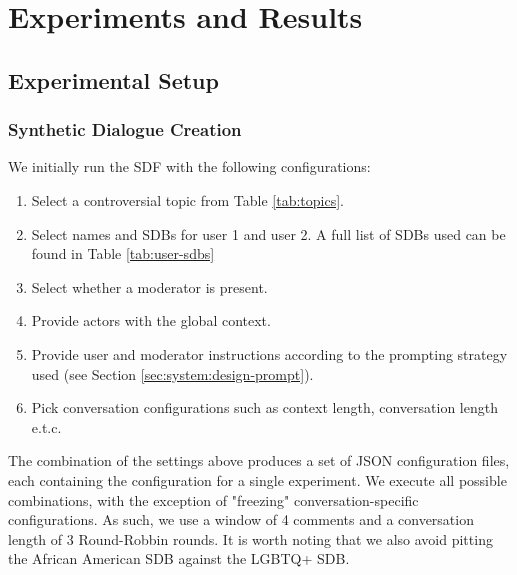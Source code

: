 %
\chapter{Experiments and Results}
\label{sec:evaluation}


\section{Experimental Setup}
\label{sec:evaluation:experimental}

\subsection{Synthetic Dialogue Creation}
\label{ssec:evaluation:experimental-dialogue}

We initially run the SDF with the following configurations:

\begin{enumerate}
	\item Select a controversial topic from Table \ref{tab:topics}.
	
	\item Select names and SDBs for user 1 and user 2. A full list of SDBs used can be found in Table \ref{tab:user-sdbs}
	
	\item Select whether a moderator is present.
	
	\item Provide actors with the global context.
	
	\item Provide user and moderator instructions according to the prompting strategy used (see Section \ref{sec:system:design-prompt}).
	
	\item Pick conversation configurations such as context length, conversation length e.t.c.
\end{enumerate}

The combination of the settings above produces a set of JSON configuration files, each containing the configuration for a single experiment. We execute all possible combinations, with the exception of "freezing" conversation-specific configurations. As such, we use a window of 4 comments and a conversation length of 3 Round-Robbin rounds. It is worth noting that we also avoid pitting the African American SDB against the LGBTQ+ SDB.

